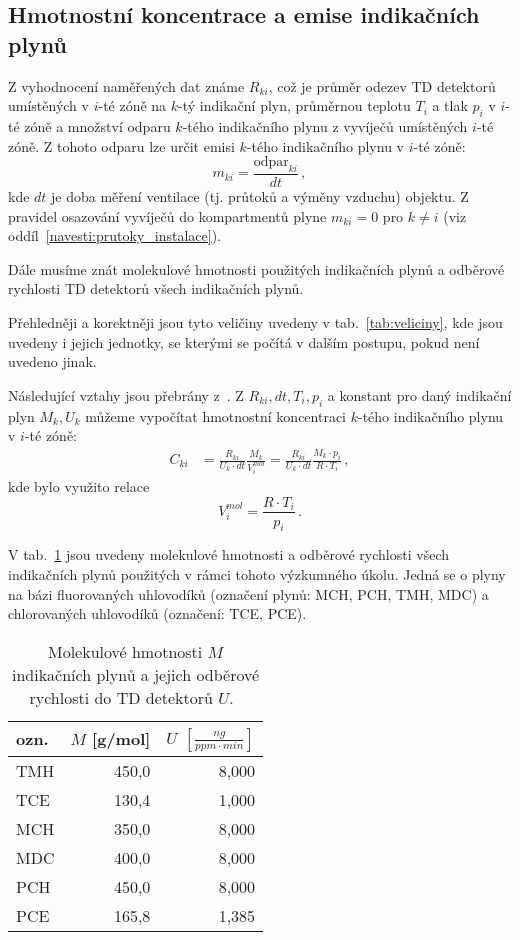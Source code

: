 \subsection{Hmotnostní koncentrace a emise indikačních plynů}
Z vyhodnocení naměřených dat známe $R_{ki}$, což je průměr odezev TD detektorů umístěných v $i$-té zóně na $k$-tý indikační plyn, průměrnou teplotu $T_i$ a tlak $p_i$ v $i$-té zóně a množství odparu $k$-tého indikačního plynu z vyvíječů umístěných $i$-té zóně. Z tohoto odparu lze určit emisi $k$-tého indikačního plynu v $i$-té zóně:
\begin{equation}
    m_{ki}=\frac{\text{odpar}_{ki}}{dt}\,,
    \label{eq:prutoky_emise}
\end{equation}
kde $dt$ je doba měření ventilace (tj. průtoků a výměny vzduchu) objektu. Z pravidel osazování vyvíječů do kompartmentů plyne $m_{ki}=0$ pro $k\neq i$ (viz oddíl~\ref{navesti:prutoky_instalace}). 

Dále musíme znát molekulové hmotnosti použitých indikačních plynů a odběrové rychlosti TD detektorů všech indikačních plynů.

Přehledněji a korektněji jsou tyto veličiny uvedeny v tab.~\ref{tab:veliciny}, kde jsou uvedeny i jejich jednotky, se kterými se počítá v dalším postupu, pokud není uvedeno jinak.

Následující vztahy jsou přebrány z~\cite{metodika}. Z $R_{ki}, dt, T_i, p_i$ a konstant pro daný indikační plyn $M_k, U_k$ můžeme vypočítat hmotnostní koncentraci $k$-tého indikačního plynu v $i$-té zóně:
\begin{align}
    C_{ki}&=\frac{R_{ki}}{U_k\cdot dt}\frac{M_k}{V_{i}^{mol}}=\frac{R_{ki}}{U_k\cdot dt}\frac{M_k\cdot p_i}{R\cdot T_i}\,,
\end{align}
kde bylo využito relace
\begin{equation}
    V^{mol}_{i}=\frac{R\cdot T_i}{p_i}\,.
    \label{eq:prutoky_molarniObjem}
\end{equation}

V tab.~\ref{tab:prutoky_plyny_konstanty} jsou uvedeny molekulové hmotnosti a odběrové rychlosti všech indikačních plynů použitých v rámci tohoto výzkumného úkolu. Jedná se o plyny na bázi fluorovaných uhlovodíků (označení plynů: MCH, PCH, TMH, MDC) a chlorovaných uhlovodíků (označení: TCE, PCE).

\begin{table}[ht]
    \centering
    \caption{Molekulové hmotnosti $M$ indikačních plynů a jejich odběrové rychlosti do TD detektorů $U$.~\cite{metodika}}
    \label{tab:prutoky_plyny_konstanty}
    \begin{tabular}{lrr}
        \toprule
ozn. & $M$ [g/mol] & $U$ $\left[\si{\frac{ng}{ppm\cdot min}}\right]$\\
\midrule
TMH & 450,0 &  8,000 \\
TCE & 130,4 &  1,000 \\
MCH & 350,0 &  8,000 \\
MDC & 400,0 &  8,000 \\
PCH & 450,0 &  8,000 \\
PCE & 165,8 &  1,385 \\
\bottomrule
    \end{tabular}
\end{table}

